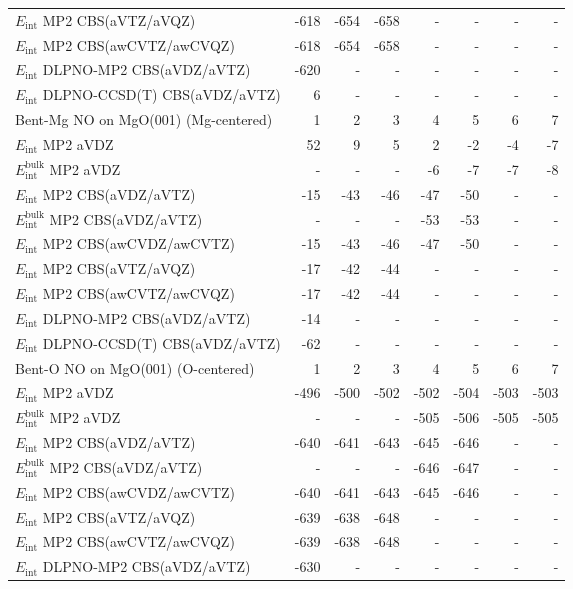 \begin{longtable}{lrrrrrrr}
$E_\text{int}$ MP2 CBS(aVTZ/aVQZ) & -618 & -654 & -658 & - & - & - & - \\
$E_\text{int}$ MP2 CBS(awCVTZ/awCVQZ) & -618 & -654 & -658 & - & - & - & - \\
$E_\text{int}$ DLPNO-MP2 CBS(aVDZ/aVTZ) & -620 & - & - & - & - & - & - \\
$E_\text{int}$ DLPNO-CCSD(T) CBS(aVDZ/aVTZ) & 6 & - & - & - & - & - & - \\
\toprule
Bent-Mg NO on MgO(001) (Mg-centered) & 1 & 2 & 3 & 4 & 5 & 6 & 7 \\ 
\midrule
$E_\text{int}$ MP2 aVDZ & 52 & 9 & 5 & 2 & -2 & -4 & -7 \\
$E_\text{int}^\text{bulk}$ MP2 aVDZ & - & - & - & -6 & -7 & -7 & -8 \\
$E_\text{int}$ MP2 CBS(aVDZ/aVTZ) & -15 & -43 & -46 & -47 & -50 & - & - \\
$E_\text{int}^\text{bulk}$ MP2 CBS(aVDZ/aVTZ) & - & - & - & -53 & -53 & - & - \\
$E_\text{int}$ MP2 CBS(awCVDZ/awCVTZ) & -15 & -43 & -46 & -47 & -50 & - & - \\
$E_\text{int}$ MP2 CBS(aVTZ/aVQZ) & -17 & -42 & -44 & - & - & - & - \\
$E_\text{int}$ MP2 CBS(awCVTZ/awCVQZ) & -17 & -42 & -44 & - & - & - & - \\
$E_\text{int}$ DLPNO-MP2 CBS(aVDZ/aVTZ) & -14 & - & - & - & - & - & - \\
$E_\text{int}$ DLPNO-CCSD(T) CBS(aVDZ/aVTZ) & -62 & - & - & - & - & - & - \\
\toprule
Bent-O NO on MgO(001) (O-centered) & 1 & 2 & 3 & 4 & 5 & 6 & 7 \\ 
\midrule
$E_\text{int}$ MP2 aVDZ & -496 & -500 & -502 & -502 & -504 & -503 & -503 \\
$E_\text{int}^\text{bulk}$ MP2 aVDZ & - & - & - & -505 & -506 & -505 & -505 \\
$E_\text{int}$ MP2 CBS(aVDZ/aVTZ) & -640 & -641 & -643 & -645 & -646 & - & - \\
$E_\text{int}^\text{bulk}$ MP2 CBS(aVDZ/aVTZ) & - & - & - & -646 & -647 & - & - \\
$E_\text{int}$ MP2 CBS(awCVDZ/awCVTZ) & -640 & -641 & -643 & -645 & -646 & - & - \\
$E_\text{int}$ MP2 CBS(aVTZ/aVQZ) & -639 & -638 & -648 & - & - & - & - \\
$E_\text{int}$ MP2 CBS(awCVTZ/awCVQZ) & -639 & -638 & -648 & - & - & - & - \\
$E_\text{int}$ DLPNO-MP2 CBS(aVDZ/aVTZ) & -630 & - & - & - & - & - & - \\

\end{longtable}
